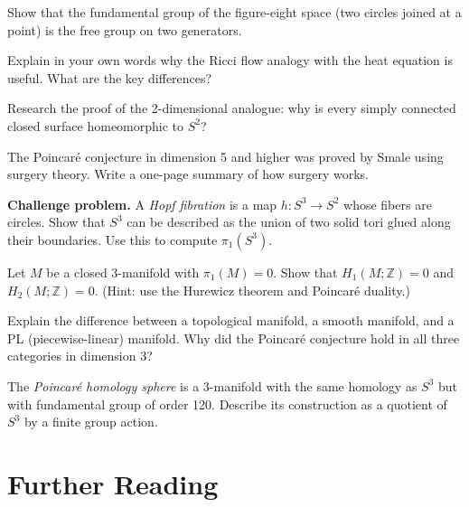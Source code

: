 \begin{exercise}
Show that the fundamental group of the figure-eight space (two circles joined at a point) is the free group on two generators.
\end{exercise}

\begin{exercise}
Explain in your own words why the Ricci flow analogy with the heat equation is useful. What are the key differences?
\end{exercise}

\begin{exercise}
Research the proof of the 2-dimensional analogue: why is every simply connected closed surface homeomorphic to $S^2$?
\end{exercise}

\begin{exercise}
The Poincar\'{e} conjecture in dimension 5 and higher was proved by Smale using surgery theory. Write a one-page summary of how surgery works.
\end{exercise}

\begin{exercise}
\textbf{Challenge problem.} A \textit{Hopf fibration} is a map $h: S^3 \to S^2$ whose fibers are circles. Show that $S^3$ can be described as the union of two solid tori glued along their boundaries. Use this to compute $\pi_1(S^3)$.
\end{exercise}

\begin{exercise}
Let $M$ be a closed 3-manifold with $\pi_1(M) = 0$. Show that $H_1(M; \mathbb{Z}) = 0$ and $H_2(M; \mathbb{Z}) = 0$. (Hint: use the Hurewicz theorem and Poincar\'{e} duality.)
\end{exercise}

\begin{exercise}
Explain the difference between a topological manifold, a smooth manifold, and a PL (piecewise-linear) manifold. Why did the Poincar\'{e} conjecture hold in all three categories in dimension 3?
\end{exercise}

\begin{exercise}
The \textit{Poincar\'{e} homology sphere} is a 3-manifold with the same homology as $S^3$ but with fundamental group of order 120. Describe its construction as a quotient of $S^3$ by a finite group action.
\end{exercise}

\section{Further Reading}

